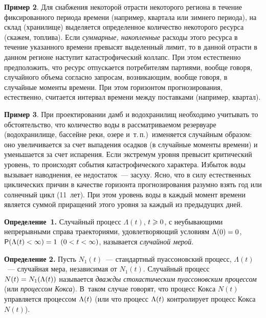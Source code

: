 \begin{multicols}{2}
\medskip

\noindent
\textbf{Пример 2}. Для снабжения некоторой отрасти некоторого региона в
течение фиксированного периода времени (например, квартала или
зимнего периода), на склад (хранилище) выделяется определенное
количество некоторого ресурса (скажем, топлива). Если {\it
суммарные, накопленные} расходы этого ресурса в течение указанного
времени превысят выделенный лимит, то в данной отрасти в данном
регионе наступит катастрофический коллапс. При этом естественно
предположить, что ресурс отпускается потребителям партиями, вообще
говоря, случайного объема согласно запросам, возникающим, вообще
говоря, в случайные моменты времени. При этом горизонтом
прогнозирования, естественно, считается интервал времени между
поставками (например, квартал).

\medskip

\noindent
\textbf{Пример 3}. При проектировании дамб и водохранилищ необходимо
учитывать то обстоятельство, что количество воды в рассматриваемом
резервуаре (водохранилище, бассейне реки, озере и~т.\,п.)\ изменяется
случайным образом: оно увеличивается за счет выпадения осадков (в
случайные моменты времени) и уменьшается за счет испарения. Если
экстремум уровня превысит критический уровень, то происходят события
катастрофического характера. Избыток воды вызывает наводнения, ее
недостаток~--- засуху. Ясно, что в силу естественных циклических
причин в качестве горизонта прогнозирования разумно взять год или
солнечный цикл (11~лет). При этом уровень воды в каждый момент
времени является суммой приращений этого уровня за каждый из
предыдущих дней.

\medskip

\noindent
\textbf{Определение~1.} Случайный процесс $\Lambda(t)$, $t\hm\geqslant 0$, с
неубывающими непрерывными справа траекториями, удовлетворяющий
условиям $\Lambda(0)\hm=0$, ${\sf P}(\Lambda(t)\hm<\infty)=1$ $(0\hm<t\hm<\infty)$,
называется {\it случайной мерой}.

\smallskip

\noindent
\textbf{Определение 2.} Пусть $N_1(t)$~--- стандартный пуассоновский
процесс, $\Lambda(t)$~--- случайная мера, независимая от $N_1(t)$.
Случайный процесс $N(t)\hm=N_1(\Lambda(t))$ называется {\it дважды
стохастическим пуассоновским процессом} (или {\it процессом Кокса}).
В~таком случае говорят, что процесс Кокса $N(t)$ управляется
процессом $\Lambda(t)$ (или что процесс $\Lambda(t)$ контролирует процесс
Кокса $N(t)$).

\smallskip


\end{multicols}
